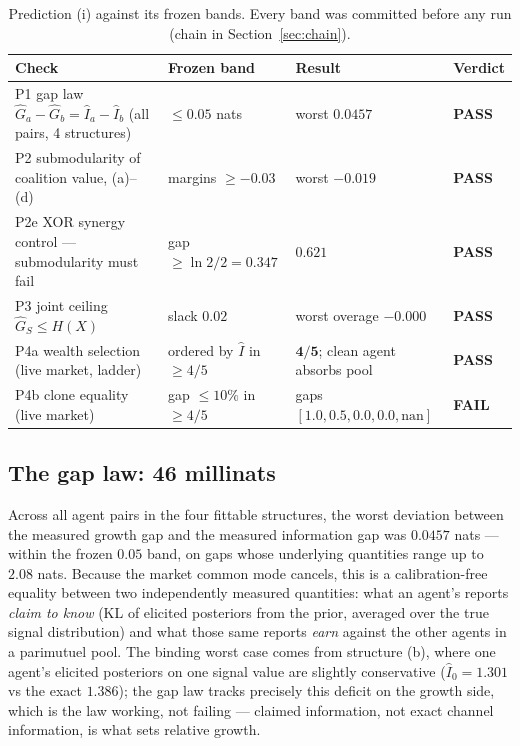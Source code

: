 \documentclass{article} %
\newcommand{\Ihat}{\hat{I}}
\newcommand{\Ghat}{\hat{G}}
\begin{document}
\begin{table}[t]
\centering
\small
\caption{Prediction (i) against its frozen bands. Every band was committed before any run (chain in Section~\ref{sec:chain}).}
\label{tab:parta}
\footnotesize
\begin{tabular}{@{}llll@{}}
\toprule
Check & Frozen band & Result & Verdict \\
\midrule
P1 gap law $\Ghat_a - \Ghat_b = \Ihat_a - \Ihat_b$ (all pairs, 4 structures) & $\leq 0.05$ nats & worst $\mathbf{0.0457}$ & \textbf{PASS} \\
P2 submodularity of coalition value, (a)--(d) & margins $\geq -0.03$ & worst $\mathbf{-0.019}$ & \textbf{PASS} \\
P2e XOR synergy control --- submodularity must fail & gap $\geq \ln2/2 = 0.347$ & $\mathbf{0.621}$ & \textbf{PASS} \\
P3 joint ceiling $\Ghat_S \leq H(X)$ & slack $0.02$ & worst overage $\mathbf{-0.000}$ & \textbf{PASS} \\
P4a wealth selection (live market, ladder) & ordered by $\Ihat$ in $\geq 4/5$ & $\mathbf{4/5}$; clean agent absorbs pool & \textbf{PASS} \\
P4b clone equality (live market) & gap $\leq 10\%$ in $\geq 4/5$ & gaps $[1.0, 0.5, 0.0, 0.0, \text{nan}]$ & \textbf{FAIL} \\
\bottomrule
\end{tabular}
\end{table}

\subsection{The gap law: 46 millinats}

Across all agent pairs in the four fittable structures, the worst deviation between the measured growth gap and the measured information gap was $0.0457$ nats --- within the frozen $0.05$ band, on gaps whose underlying quantities range up to $2.08$ nats. Because the market common mode cancels, this is a calibration-free equality between two independently measured quantities: what an agent's reports \emph{claim to know} (KL of elicited posteriors from the prior, averaged over the true signal distribution) and what those same reports \emph{earn} against the other agents in a parimutuel pool. The binding worst case comes from structure (b), where one agent's elicited posteriors on one signal value are slightly conservative ($\Ihat_0 = 1.301$ vs the exact $1.386$); the gap law tracks precisely this deficit on the growth side, which is the law working, not failing --- claimed information, not exact channel information, is what sets relative growth.
\end{document}
